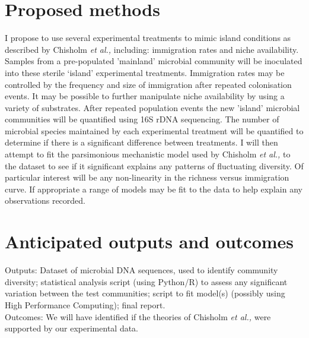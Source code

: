 \documentclass[11pt]{article}
\begin{document}
  \section{Proposed methods}
  I propose to use several experimental treatments to mimic island conditions as described by Chisholm \textit{et al.,} including: immigration rates and niche availability. Samples from a pre-populated 'mainland' microbial community will be inoculated into these sterile ‘island’ experimental treatments. Immigration rates may be controlled by the frequency and size of immigration after repeated colonisation events. It may be possible to further manipulate niche availability by using a variety of substrates\cite{lyons2010theory}. After repeated population events the new 'island' microbial communities will be quantified using 16S rDNA sequencing. The number of microbial species maintained by each experimental treatment will be quantified to determine if there is a significant difference between treatments. I will then attempt to fit the parsimonious mechanistic model used by Chisholm \textit{et al.,} to the dataset to see if it significant explains any patterns of fluctuating diversity. Of particular interest will be any non-linearity in the richness versus immigration curve. If appropriate a range of models may be fit to the data to help explain any observations recorded.
  
  \section{Anticipated outputs and outcomes}
  Outputs: Dataset of microbial DNA sequences, used to identify community diversity; statistical analysis script (using Python/R) to assess any significant variation between the test communities; script to fit model(s) (possibly using High Performance Computing); final report. \\
Outcomes: We will have identified if the theories of Chisholm \textit{et al.,} were supported by our experimental data.
\end{document}
